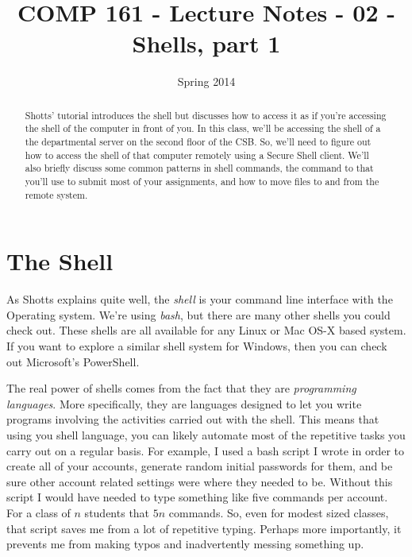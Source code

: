 \documentclass[]{tufte-handout}
\title{COMP 161 - Lecture Notes - 02 - Shells, part 1}
\date{Spring 2014}
\begin{document}
\maketitle

\begin{abstract}
Shotts' tutorial introduces the shell but discusses how to access it as if you're accessing the shell of the computer in front of you.  In this class, we'll be accessing the shell of a the departmental server on the second floor of the CSB.  So, we'll need to figure out how to access the shell of that computer remotely using a Secure Shell client. We'll also briefly discuss some common patterns in shell commands, the command to that you'll use to submit most of your assignments, and how to move files to and from the remote system. 
\end{abstract}

\section{The Shell}

As Shotts explains quite well, the \textit{shell} is your command line interface with the Operating system.  We're using \textit{bash}, but there are many other shells you could check out.  These shells are all available for any Linux or Mac OS-X based system. If you want to explore a similar shell system for Windows, then you can check out Microsoft's PowerShell.    

The real power of shells comes from the fact that they are \textit{programming languages}.  More specifically, they are languages designed to let you write programs involving the activities carried out with the shell.  This means that using you shell language, you can likely automate most of the repetitive tasks you carry out on a regular basis.  For example, I used a bash script I wrote in order to create all of your accounts, generate random initial passwords for them, and be sure other account related settings were where they needed to be.  Without this script I would have needed to type something like five commands per account. For a class of $n$ students that $5n$ commands.  So, even for modest sized classes, that script saves me from a lot of repetitive typing. Perhaps more importantly, it prevents me from making typos and inadvertently messing something up. 
\end{document}
